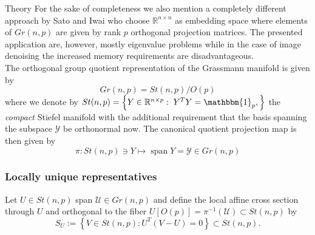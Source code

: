 \begin{chapter}{Theory}
For the sake of completeness we also mention a completely different approach by Sato and Iwai \cite{Sato2014} who choose $\mathbb{R}^{n\times n}$ as embedding space
where elements of $Gr(n,p)$ are given by rank $p$ orthogonal projection matrices. The presented application are, however, mostly eigenvalue problems while in the case
of image denoising the increased memory requirements are disadvantageous.\\

The orthogonal group quotient representation of the Grassmann manifold is given by
\begin{equation}
    Gr(n,p) = St(n,p) / O(p) %
\end{equation}
where we denote by $St(n,p)=\left\lbrace Y\in\mathbb{R}^{n\times p}:\; Y^TY=\mathbbm{1}_p,\right\rbrace$ the \emph{compact} Stiefel manifold with the additional
requirement that the basis spanning the subspace $\mathcal{Y}$ be orthonormal now. The canonical quotient projection map is then given by
\begin{equation}
    \pi : St(n,p)\ni Y \mapsto \operatorname{span} Y=\mathcal{Y} \in Gr(n, p)
\end{equation}

\subsubsection{Locally unique representatives} %
\label{ssub:Locally unique Representative}
Let $U\in St(n,p)$ span $\mathcal{U}\in Gr(n,p)$ and define the local affine cross section through $U$ and orthogonal to the fiber $U[O(p)]=\pi^{-1}(\mathcal{U})\subset St(n,p)$ by
\begin{equation}
    S_U := \left\lbrace V\in St(n,p): U^T(V-U)=0 \right\rbrace\subset St(n,p).
\end{equation}


\end{chapter}
